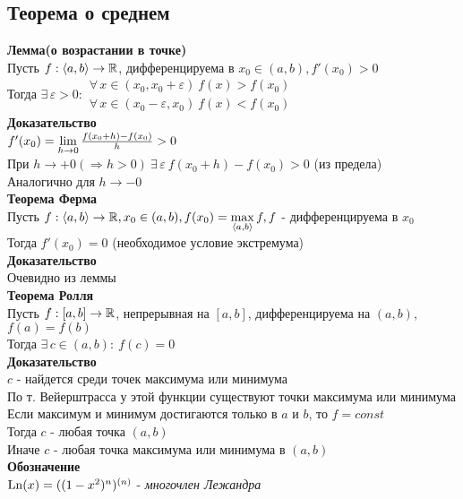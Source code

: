 \documentclass[12pt]{article}
\begin{document}
\subsection{Теорема о среднем}
\textbf{Лемма(о возрастании в точке)}\\
Пусть $f:\langle a, b\rangle \rightarrow \mathbb{R}$, дифференцируема в $x_0 \in (a,b), f'(x_0) > 0$\\
Тогда $\exists\,\varepsilon > 0:\begin{array}{cc}
     \forall\,x\in (x_0, x_0+\varepsilon)\ f(x) > f(x_0)\\
     \forall\,x\in (x_0-\varepsilon, x_0)\ f(x) < f(x_0)
\end{array}$\\
\textbf{Доказательство}\\
$f'(x_0) = \lim\limits_{h\rightarrow 0} \frac{f(x_0+h)-f(x_0)}{h} > 0$\\
При $h \rightarrow +0 (\Rightarrow h > 0)\ \exists\,\varepsilon\ f(x_0+h) - f(x_0) > 0$ (из предела)\\
Аналогично для $h \rightarrow -0$\\
\textbf{Теорема Ферма}\\
Пусть $f:\langle a, b \rangle \rightarrow \mathbb{R}, x_0 \in (a,b), f(x_0) = \max\limits_{\langle a, b \rangle} f, f$ - дифференцируема в $x_0$\\
Тогда $f'(x_0) = 0$ (необходимое условие экстремума)\\
\textbf{Доказательство}\\
Очевидно из леммы\\
\textbf{Теорема Ролля}\\
Пусть $f:[a,b] \rightarrow \mathbb{R}$, непрерывная на $[a,b]$, дифференцируема на $(a,b)$, $f(a) = f(b)$\\
Тогда $\exists\,c \in (a,b):\ f(c) = 0$\\
\textbf{Доказательство}\\
$c$ - найдется среди точек максимума или минимума\\
По т. Вейерштрасса у этой функции существуют точки максимума или минимума\\
Если максимум и минимум достигаются только в $a$ и $b$, то $f = const$\\
Тогда $c$ - любая точка $(a,b)$\\
Иначе $c$ - любая точка максимума или минимума в $(a,b)$\\
\textbf{Обозначение}\\
$\operatorname{Ln}(x) = ((1-x^2)^n)^{(n)}$ - \textit{многочлен Лежандра}\\
\end{document}
